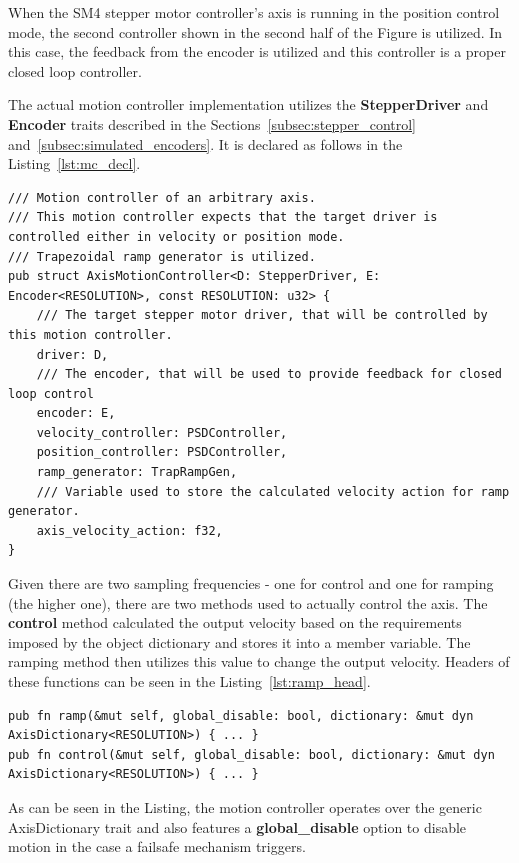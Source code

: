 When the SM4 stepper motor controller's axis is running in the position control mode, the second controller shown in the second half of the Figure is utilized.
In this case, the feedback from the encoder is utilized and this controller is a proper closed loop controller.

The actual motion controller implementation utilizes the \textbf{StepperDriver} and \textbf{Encoder} traits described in the Sections~\ref{subsec:stepper_control} and~\ref{subsec:simulated_encoders}.
It is declared as follows in the Listing~\ref{lst:mc_decl}.
\begin{lstlisting}[caption={Implementation of the PSD controller with integrator.},label=lst:mc_decl]
/// Motion controller of an arbitrary axis.
/// This motion controller expects that the target driver is controlled either in velocity or position mode.
/// Trapezoidal ramp generator is utilized.
pub struct AxisMotionController<D: StepperDriver, E: Encoder<RESOLUTION>, const RESOLUTION: u32> {
    /// The target stepper motor driver, that will be controlled by this motion controller.
    driver: D,
    /// The encoder, that will be used to provide feedback for closed loop control
    encoder: E,
    velocity_controller: PSDController,
    position_controller: PSDController,
    ramp_generator: TrapRampGen,
    /// Variable used to store the calculated velocity action for ramp generator.
    axis_velocity_action: f32,
}
\end{lstlisting}

Given there are two sampling frequencies - one for control and one for ramping (the higher one), there are two methods used to actually control the axis.
The \textbf{control} method calculated the output velocity based on the requirements imposed by the object dictionary and stores it into a member variable.
The ramping method then utilizes this value to change the output velocity.
Headers of these functions can be seen in the Listing~\ref{lst:ramp_head}.
\begin{lstlisting}[caption={Headers of the ramp and control functions.},label=lst:ramp_head]
pub fn ramp(&mut self, global_disable: bool, dictionary: &mut dyn AxisDictionary<RESOLUTION>) { ... }
pub fn control(&mut self, global_disable: bool, dictionary: &mut dyn AxisDictionary<RESOLUTION>) { ... }
\end{lstlisting}
As can be seen in the Listing, the motion controller operates over the generic AxisDictionary trait and also features a \textbf{global\_disable} option to disable motion in the case a failsafe mechanism triggers.
